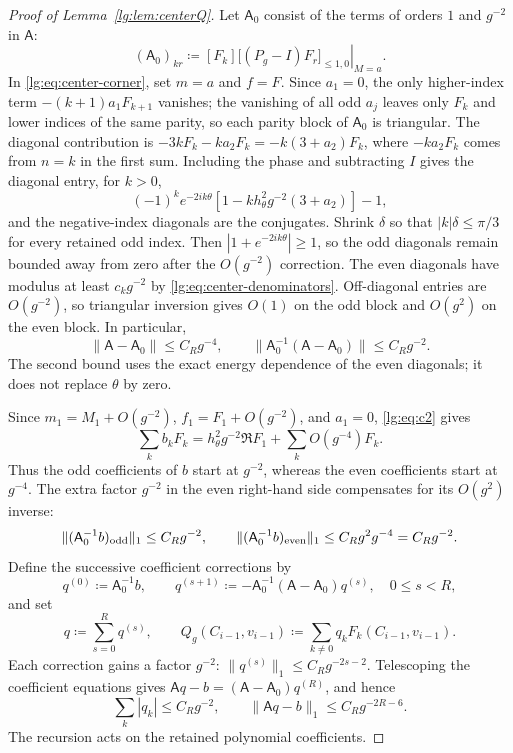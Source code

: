 \documentclass[11pt]{article}
\numberwithin{equation}{section}
\theoremstyle{remark}
\begin{document}
\begin{proof}[Proof of Lemma~\ref{lg:lem:centerQ}]
Let $\mathsf A_0$ consist of the terms of orders $1$ and $g^{-2}$ in $\mathsf A$:
\[
 (\mathsf A_0)_{kr}\coloneqq
 [F_k]\left.\bigl[(P_g-I)F_r\bigr]_{\le1,0}\right|_{M=a}.
\]
In \eqref{lg:eq:center-corner}, set $m=a$ and $f=F$.
Since $a_1=0$, the only higher-index term $-(k+1)a_1F_{k+1}$ vanishes;
the vanishing of all odd $a_j$ leaves only $F_k$ and lower indices
of the same parity, so each parity block of $\mathsf A_0$ is triangular.
The diagonal contribution is $-3kF_k-ka_2F_k=-k(3+a_2)F_k$,
where $-ka_2F_k$ comes from $n=k$ in the first sum.
Including the phase and subtracting $I$ gives the diagonal entry, for $k>0$,
\[
 (-1)^ke^{-2ik\theta}
       [1-kh_\theta^2g^{-2}(3+a_2)]-1,
\]
and the negative-index diagonals are the conjugates.
Shrink $\delta$ so that $|k|\delta\le\pi/3$ for every retained odd
index. Then $|1+e^{-2ik\theta}|\ge1$, so the odd diagonals remain
bounded away from zero after the $O(g^{-2})$ correction. The even
diagonals have modulus at least $c_kg^{-2}$ by
\eqref{lg:eq:center-denominators}. Off-diagonal entries are $O(g^{-2})$, so triangular
inversion gives $O(1)$ on the odd block and $O(g^2)$ on the even
block. In particular,
\[
 \|\mathsf A-\mathsf A_0\|\le C_Rg^{-4},\qquad
 \|\mathsf A_0^{-1}(\mathsf A-\mathsf A_0)\|\le C_Rg^{-2}.
\]
The second bound uses the exact energy dependence of the even
diagonals; it does not replace $\theta$ by zero.

Since $m_1=M_1+O(g^{-2})$, $f_1=F_1+O(g^{-2})$, and $a_1=0$,
\eqref{lg:eq:c2} gives
\[
 \sum_kb_kF_k=h_\theta^2g^{-2}\Re F_1
                        +\sum_kO(g^{-4})F_k.
\]
Thus the odd coefficients of $b$ start at $g^{-2}$, whereas the
even coefficients start at $g^{-4}$. The extra factor $g^{-2}$
in the even right-hand side compensates for its $O(g^2)$ inverse:
\[
 \| (\mathsf A_0^{-1}b)_{\rm odd}\|_1\le C_Rg^{-2},\qquad
 \| (\mathsf A_0^{-1}b)_{\rm even}\|_1
       \le C_Rg^2g^{-4}=C_Rg^{-2}.
\]
Define the successive coefficient corrections by
\begin{equation}\label{lg:eq:Q-recursion}
 q^{(0)}\coloneqq\mathsf A_0^{-1}b,\qquad
 q^{(s+1)}\coloneqq-\mathsf A_0^{-1}
       (\mathsf A-\mathsf A_0)q^{(s)},\quad 0\le s<R,
\end{equation}
and set
\begin{equation}\label{lg:eq:Q-definition}
 q\coloneqq\sum_{s=0}^{R}q^{(s)},\qquad
 Q_g(C_{i-1},v_{i-1})\coloneqq
       \sum_{k\ne0}q_kF_k(C_{i-1},v_{i-1}).
\end{equation}
Each correction gains a factor $g^{-2}$:
$\|q^{(s)}\|_1\le C_Rg^{-2s-2}$.
Telescoping the coefficient equations gives
$\mathsf A q-b=(\mathsf A-\mathsf A_0)q^{(R)}$, and hence
\begin{equation}\label{lg:eq:raw-Q-coefficient-bounds}
 \sum_k|q_k|\le C_Rg^{-2},\qquad
 \|\mathsf A q-b\|_1\le C_Rg^{-2R-6}.
\end{equation}
The recursion acts on the retained polynomial coefficients.


\end{proof}
\end{document}
